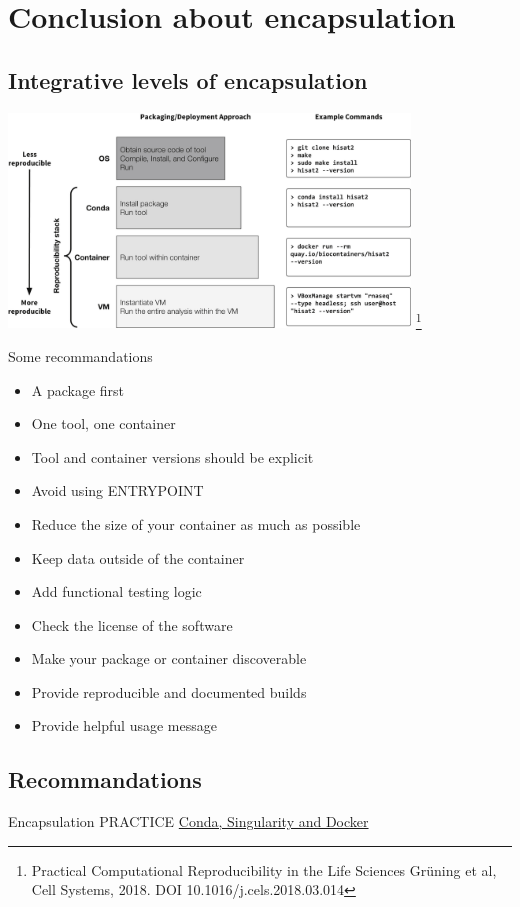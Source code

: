 \section{Conclusion about encapsulation}
\subsection{Integrative levels of encapsulation}
\begin{frame}
\centering\includegraphics[width=0.8\textwidth]{images/reproductibility.jpg} \footnote{Practical Computational Reproducibility in the Life Sciences
Grüning et al, Cell Systems, 2018. DOI 10.1016/j.cels.2018.03.014}
\end{frame}


\begin{frame}[<+->]
Some recommandations 
\begin{itemize}
\item A package first
\item One tool, one container
\item Tool and container versions should be explicit
\item Avoid using ENTRYPOINT
\item Reduce the size of your container as much as possible
\item Keep data outside of the container
\item Add functional testing logic
\item Check the license of the software
\item Make your package or container discoverable
\item Provide reproducible and documented builds
\item Provide helpful usage message
\end{itemize}
\end{frame}

\subsection{Recommandations}
\begin{frame}
\begin{block}{Encapsulation PRACTICE}
\href{https://github.com/mesocentre-clermont-auvergne/formation_fair_2022/tree/main/fair_encapsulation/encapsulation_TP}{Conda, Singularity and Docker}

\end{block}
\end{frame}
